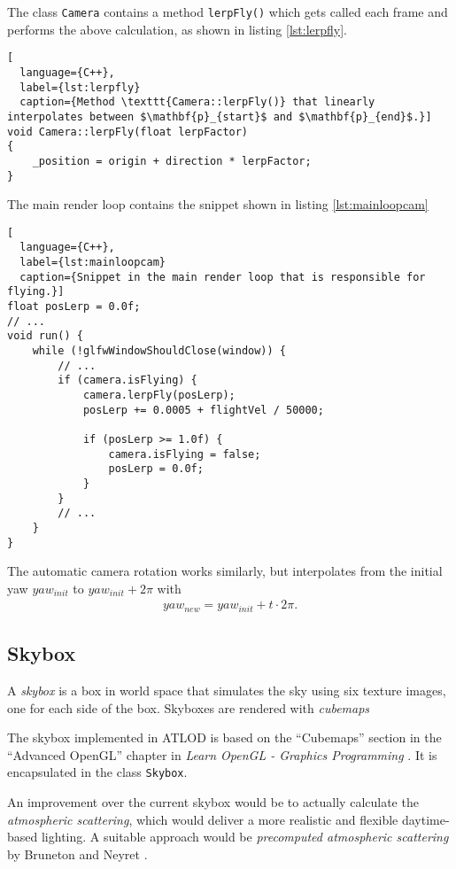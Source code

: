 The class \texttt{Camera} contains a method \texttt{lerpFly()} which gets called each frame and performs the above calculation, as shown in listing \ref{lst:lerpfly}.
\begin{lstlisting}[
  language={C++},
  label={lst:lerpfly}
  caption={Method \texttt{Camera::lerpFly()} that linearly interpolates between $\mathbf{p}_{start}$ and $\mathbf{p}_{end}$.}]
void Camera::lerpFly(float lerpFactor)
{     
    _position = origin + direction * lerpFactor;
}
\end{lstlisting}

The main render loop contains the snippet shown in listing \ref{lst:mainloopcam}
\begin{lstlisting}[
  language={C++},
  label={lst:mainloopcam}
  caption={Snippet in the main render loop that is responsible for flying.}]
float posLerp = 0.0f;
// ...
void run() {
    while (!glfwWindowShouldClose(window)) {
        // ...
        if (camera.isFlying) {
            camera.lerpFly(posLerp);
            posLerp += 0.0005 + flightVel / 50000;

            if (posLerp >= 1.0f) {
                camera.isFlying = false;
                posLerp = 0.0f;
            }
        }
        // ...
    }
}
\end{lstlisting}

The automatic camera rotation works similarly, but interpolates from the initial yaw $yaw_{init}$ to
$yaw_{init} + 2\pi$ with
\begin{align*}
  yaw_{new} = yaw_{init} + t \cdot 2\pi. 
\end{align*}

\subsection{Skybox}
A \textit{skybox} is a box in world space that simulates the sky using
six texture images, one for each side of the box. 
Skyboxes are rendered with \textit{cubemaps}

The skybox implemented in ATLOD is based on the ``Cubemaps'' section in the ``Advanced OpenGL'' chapter in \textit{Learn OpenGL - Graphics Programming} \cite{learnopengl}.
It is encapsulated in the class \texttt{Skybox}.


An improvement over the current skybox would be to actually calculate the \textit{atmospheric scattering},
which would deliver a more realistic and flexible daytime-based lighting.
A suitable approach would be \textit{precomputed atmospheric scattering} by Bruneton and Neyret \cite{precomputedatmosphericscattering}.

